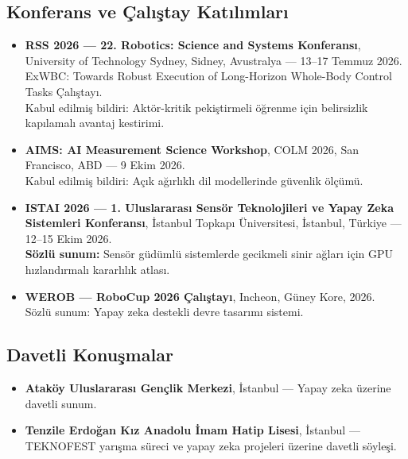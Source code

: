 \documentclass[11pt,a4paper]{article}
\begin{document}
\subsection*{Konferans ve Çalıştay Katılımları}
\begin{itemize}
    \item \textbf{RSS 2026 --- 22. Robotics: Science and Systems Konferansı}, University of Technology Sydney, Sidney, Avustralya --- 13--17 Temmuz 2026. \\
    ExWBC: Towards Robust Execution of Long-Horizon Whole-Body Control Tasks Çalıştayı. \\
    Kabul edilmiş bildiri: Aktör-kritik pekiştirmeli öğrenme için belirsizlik kapılamalı avantaj kestirimi.
    \item \textbf{AIMS: AI Measurement Science Workshop}, COLM 2026, San Francisco, ABD --- 9 Ekim 2026. \\
    Kabul edilmiş bildiri: Açık ağırlıklı dil modellerinde güvenlik ölçümü.
    \item \textbf{ISTAI 2026 --- 1. Uluslararası Sensör Teknolojileri ve Yapay Zeka Sistemleri Konferansı}, İstanbul Topkapı Üniversitesi, İstanbul, Türkiye --- 12--15 Ekim 2026. \\
    \textbf{Sözlü sunum:} Sensör güdümlü sistemlerde gecikmeli sinir ağları için GPU hızlandırmalı kararlılık atlası.
    \item \textbf{WEROB --- RoboCup 2026 Çalıştayı}, Incheon, Güney Kore, 2026. \\
    Sözlü sunum: Yapay zeka destekli devre tasarımı sistemi.
\end{itemize}

\subsection*{Davetli Konuşmalar}
\begin{itemize}
    \item \textbf{Ataköy Uluslararası Gençlik Merkezi}, İstanbul --- Yapay zeka üzerine davetli sunum.
    \item \textbf{Tenzile Erdoğan Kız Anadolu İmam Hatip Lisesi}, İstanbul --- TEKNOFEST yarışma süreci ve yapay zeka projeleri üzerine davetli söyleşi.
\end{itemize}
\end{document}
